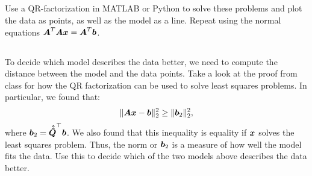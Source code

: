 \documentclass[11pt,letterpaper]{article}
\begin{document}
\subsection{} Use a QR-factorization in MATLAB or Python to solve these
  problems and plot the data as points, as well as the model as a
  line. Repeat using the normal equations $\boldsymbol{A}^T\boldsymbol{A}\boldsymbol{x} =
  \boldsymbol{A}^T\boldsymbol{b}$.
\subsection{} To decide which model describes the data better, we need to
  compute the distance between the model and the data points. Take a
  look at the proof from class for how  the QR  factorization can be
  used to solve least squares  problems. In  particular, we found
  that:
  $$
  \|\boldsymbol{A}\boldsymbol{x}  - \boldsymbol{b}\|_2^2 \ge \|\boldsymbol{b}_2\|_2^2,
  $$ where $\boldsymbol{b}_2 = \boldsymbol{\hat{\hat Q}}^\top\boldsymbol{b}$. We also
  found that this inequality is equality if $\boldsymbol{x}$ solves
  the least squares problem. Thus, the norm or $\boldsymbol{b}_2$ is a
  measure of how well the model fits the data. Use this to decide
  which of the two models above describes the data better.
  
    
    
\printbibliography
\end{document}
